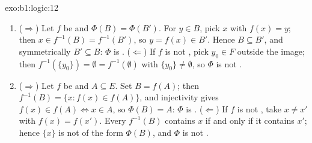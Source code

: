 \begin{solution}{exo:b1:logic:12}
\begin{enumerate}
  \item ($\Rightarrow$) Let $f$ be  and $\Phi(B) =
        \Phi(B')$. For $y \in B$, pick $x$ with $f(x) = y$; then $x
        \in f^{-1}(B) = f^{-1}(B')$, so $y = f(x) \in B'$. Hence $B
        \subseteq B'$, and symmetrically $B' \subseteq B$: $\Phi$ is
        . ($\Leftarrow$) If $f$ is not , pick $y_0
        \in F$ outside the image; then $f^{-1}(\{y_0\}) = \emptyset =
        f^{-1}(\emptyset)$ with $\{y_0\} \neq \emptyset$, so $\Phi$ is
        not .
  \item ($\Rightarrow$) Let $f$ be  and $A \subseteq E$. Set
        $B = f(A)$; then $f^{-1}(B) = \{x : f(x) \in f(A)\}$, and
        injectivity gives $f(x) \in f(A) \iff x \in A$, so $\Phi(B) =
        A$: $\Phi$ is . ($\Leftarrow$) If $f$ is not
        , take $x \neq x'$ with $f(x) = f(x')$. Every
          $f^{-1}(B)$ contains $x$ if and only if it
        contains $x'$; hence $\{x\}$ is not of the form $\Phi(B)$, and
        $\Phi$ is not .
\end{enumerate}
\end{solution}

